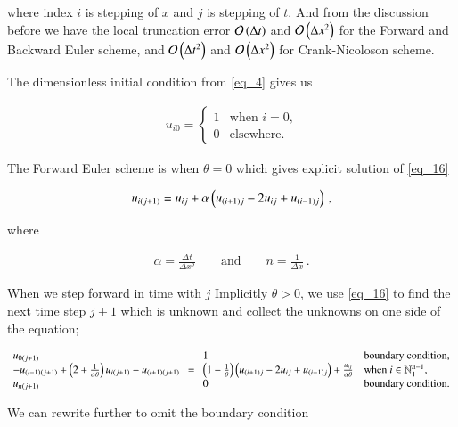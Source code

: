 \documentclass[11pt,english,a4paper]{article}
\begin{document}
\begin{flushleft}
where index $i$ is stepping of $x$ and $j$ is stepping of $t$. And from the discussion before we have the local truncation error $\mathcal{O}\left({\Delta t}\right)$ and $\mathcal{O}\left({\Delta x^2}\right)$ for the Forward and Backward Euler scheme, and $\mathcal{O}\left({\Delta t^2}\right)$ and $\mathcal{O}\left({\Delta x^2}\right)$ for Crank-Nicoloson scheme. \linebreak

The dimensionless initial condition from \eqref{eq_4} gives us

\begin{align*}
u_{i0} = \begin{cases} 1 & \text{when $i=0$,} \\ 0 & \text{elsewhere.} \end{cases} 
\end{align*}

The Forward Euler scheme is when $\theta = 0$ which gives explicit solution of \eqref{eq_16}

\begin{align}
u_{i(j+1)} = u_{ij} + \alpha\left({u_{(i+1)j} - 2 u_{ij} + u_{(i-1)j}}\right) \,,
\label{eq_17}
\end{align} 

where

\begin{align*}
\alpha = \frac{\Delta t}{\Delta x^2} \qquad \text{and} \qquad n = \frac{1}{\Delta x} \,.
\end{align*}

When we step forward in time with $j$ Implicitly $\theta > 0$, we use \eqref{eq_16} to find the next time step $j+1$ which is unknown and collect the unknowns on one side of the equation;

\begin{align*}
\begin{array}{l} u_{0(j+1)} \\ -u_{(i-1)(j+1)} +\left({2+\frac{1}{\alpha \theta}}\right)u_{i(j+1)} - u_{(i+1)(j+1)} \\ u_{n(j+1)}\end{array} = \begin{array}{ll} 1 & \text{boundary condition,} \\ \left({1-\frac{1}{\theta}}\right)\left({u_{(i+1)j} - 2u_{ij} + u_{(i-1)j}}\right) + \frac{u_{ij}}{\alpha\theta} & \text{when $i\in\mathbb{N}_1^{n-1}$,}\\ 0  & \text{boundary condition.}\end{array}
\end{align*} 

We can rewrite further to omit the boundary condition


\end{flushleft}
\end{document}
